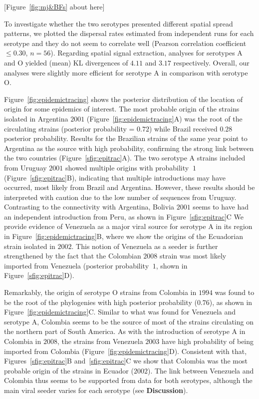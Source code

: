 \documentclass[10pt]{article}
\begin{document}
\begin{center}
 [Figure~\ref{fig:mj&BFs} about here]
\end{center}

To investigate whether the two serotypes presented different spatial spread patterns, we plotted the dispersal rates estimated from independent runs for each serotype and they do not seem to correlate well (Pearson correlation coefficient $\leq 0.30$, $n = 56$).
Regarding spatial signal extraction, analyses for serotypes  A and O yielded (mean) KL divergences of $4.11$ and $3.17$ respectively.
Overall, our analyses were slightly more efficient for serotype A in comparison with serotype O.


Figure~\ref{fig:epidemictracing} shows the posterior distribution of the  location of origin for some epidemics of interest.
The most probable origin of the strains isolated in Argentina $2001$ (Figure~\ref{fig:epidemictracing}A) was the root of the circulating strains (posterior probability = $0.72$) while Brazil received $0.28$ posterior probability.
Results for the Brazilian strains of the same year point to  Argentina as the source with high probability, confirming the strong link between the two countries (Figure~\ref{sfig:epitrac}A).
The two serotype A strains included from Uruguay $2001$ showed multiple origins with probability $~1$ (Figure~\ref{sfig:epitrac}B), indicating that multiple introductions may have occurred, most likely from Brazil and Argentina.
However, these results should be interpreted with caution due to the low number of sequences from Uruguay.
Contrasting to the connectivity with Argentina, Bolivia $2001$ seems to have had an independent introduction from Peru, as shown in Figure~\ref{sfig:epitrac}C
We provide evidence of Venezuela as a major viral source for serotype A in its region in Figure~\ref{fig:epidemictracing}B, where we show the origins of the Ecuadorian strain isolated in $2002$.
This notion of Venezuela as a seeder is further strengthened by the fact that the Colombian $2008$ strain was most likely imported from Venezuela (posterior probability $~1$, shown in Figure~\ref{sfig:epitrac}D).

Remarkably, the origin of serotype O strains from Colombia in $1994$ was found to be the root of the phylogenies with high posterior probability ($0.76$), as shown in Figure~\ref{fig:epidemictracing}C.
Similar to what was found for Venezuela and serotype A, Colombia seems to be the source of most of the strains circulating on the northern part of South America.
As with the introduction of serotype A in Colombia in $2008$, the strains from Venezuela $2003$ have high probability of being imported from Colombia (Figure~\ref{fig:epidemictracing}D).
Consistent with that, Figures~\ref{sfig:epitrac}B and~\ref{sfig:epitrac}C we show that Colombia was the most probable origin of the strains in Ecuador ($2002$).
The link between Venezuela and Colombia thus seems to be supported from data for both serotypes, although the main viral seeder varies for each serotype (see \textbf{Discussion}).
\end{document}
